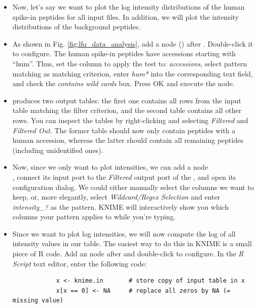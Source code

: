 \begin{itemize}
    \item Now, let's say we want to plot the log intensity distributions of the human spike-in peptides for all input files. In addition, we will plot the intensity distributions of the background peptides.
    \item As shown in Fig. \ref{fig:lfq_data_analysis}, add a  node () after . Double-click it to configure. The human spike-in peptides have accessions starting with ``hum''. Thus, set the column to apply the test to: \textit{accessions}, select pattern matching as matching criterion, enter \textit{hum*} into the corresponding text field, and check the \textit{contains wild cards} box. Press OK and execute the node.
    \item {} produces two output tables: the first one contains all rows from the input table matching the filter criterion, and the second table contains all other rows. You can inspect the tables by right-clicking and selecting \textit{Filtered} and \textit{Filtered Out}. The former table should now only contain peptides with a human accession, whereas the latter should contain all remaining peptides (including unidentified ones).
    \item Now, since we only want to plot intensities, we can add a  node \\ , connect its input port to the \textit{Filtered} output port of the , and open its configuration dialog. We could either manually select the columns we want to keep, or, more elegantly, select \textit{Wildcard/Regex Selection} and enter \textit{intensity\_?} as the pattern. KNIME will interactively show you which columns your pattern applies to while you're typing.
    \item Since we want to plot log intensities, we will now compute the log of all intensity values in our table. The easiest way to do this in KNIME is a small piece of R code. Add an  node  after  and double-click to configure. In the \textit{R Script} text editor, enter the following code:
        \begin{lstlisting}
            x <- knime.in       # store copy of input table in x
            x[x == 0] <- NA     # replace all zeros by NA (= missing value)

\end{lstlisting}
\end{itemize}
